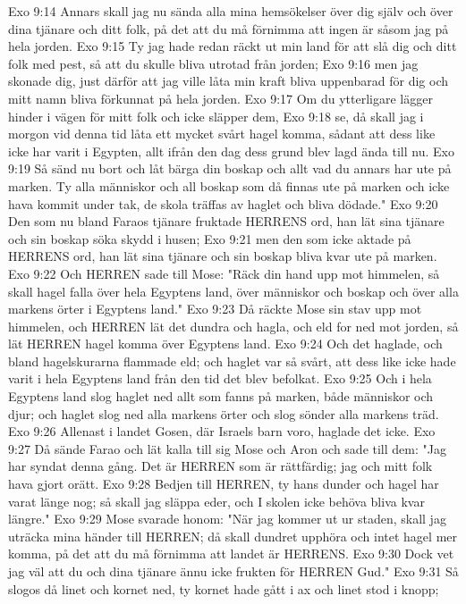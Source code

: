Exo 9:14  Annars skall jag nu sända alla mina hemsökelser över dig själv och över dina tjänare och ditt folk, på det att du må förnimma att ingen är såsom jag på hela jorden.
Exo 9:15  Ty jag hade redan räckt ut min land för att slå dig och ditt folk med pest, så att du skulle bliva utrotad från jorden;
Exo 9:16  men jag skonade dig, just därför att jag ville låta min kraft bliva uppenbarad för dig och mitt namn bliva förkunnat på hela jorden.
Exo 9:17  Om du ytterligare lägger hinder i vägen för mitt folk och icke släpper dem,
Exo 9:18  se, då skall jag i morgon vid denna tid låta ett mycket svårt hagel komma, sådant att dess like icke har varit i Egypten, allt ifrån den dag dess grund blev lagd ända till nu.
Exo 9:19  Så sänd nu bort och låt bärga din boskap och allt vad du annars har ute på marken. Ty alla människor och all boskap som då finnas ute på marken och icke hava kommit under tak, de skola träffas av haglet och bliva dödade."
Exo 9:20  Den som nu bland Faraos tjänare fruktade HERRENS ord, han lät sina tjänare och sin boskap söka skydd i husen;
Exo 9:21  men den som icke aktade på HERRENS ord, han lät sina tjänare och sin boskap bliva kvar ute på marken.
Exo 9:22  Och HERREN sade till Mose: "Räck din hand upp mot himmelen, så skall hagel falla över hela Egyptens land, över människor och boskap och över alla markens örter i Egyptens land."
Exo 9:23  Då räckte Mose sin stav upp mot himmelen, och HERREN lät det dundra och hagla, och eld for ned mot jorden, så lät HERREN hagel komma över Egyptens land.
Exo 9:24  Och det haglade, och bland hagelskurarna flammade eld; och haglet var så svårt, att dess like icke hade varit i hela Egyptens land från den tid det blev befolkat.
Exo 9:25  Och i hela Egyptens land slog haglet ned allt som fanns på marken, både människor och djur; och haglet slog ned alla markens örter och slog sönder alla markens träd.
Exo 9:26  Allenast i landet Gosen, där Israels barn voro, haglade det icke.
Exo 9:27  Då sände Farao och lät kalla till sig Mose och Aron och sade till dem: "Jag har syndat denna gång. Det är HERREN som är rättfärdig; jag och mitt folk hava gjort orätt.
Exo 9:28  Bedjen till HERREN, ty hans dunder och hagel har varat länge nog; så skall jag släppa eder, och I skolen icke behöva bliva kvar längre."
Exo 9:29  Mose svarade honom: "När jag kommer ut ur staden, skall jag uträcka mina händer till HERREN; då skall dundret upphöra och intet hagel mer komma, på det att du må förnimma att landet är HERRENS.
Exo 9:30  Dock vet jag väl att du och dina tjänare ännu icke frukten för HERREN Gud."
Exo 9:31  Så slogos då linet och kornet ned, ty kornet hade gått i ax och linet stod i knopp;
